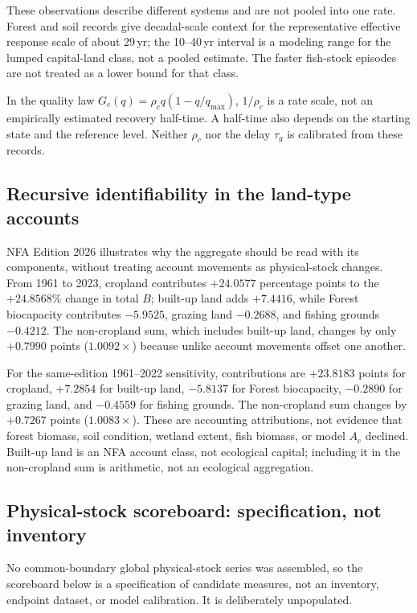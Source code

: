 \documentclass[11pt,a4paper]{article}
\begin{document}
These observations describe different systems and are not pooled into one rate. Forest and soil records give decadal-scale context for the representative effective response scale of about 29\,yr; the 10--40\,yr interval is a modeling range for the lumped capital-land class, not a pooled estimate. The faster fish-stock episodes are not treated as a lower bound for that class.

In the quality law $G_c(q)=\rho_c q(1-q/q_{\max})$, $1/\rho_c$ is a rate scale, not an empirically estimated recovery half-time. A half-time also depends on the starting state and the reference level. Neither $\rho_c$ nor the delay $\tau_g$ is calibrated from these records.

\subsection{Recursive identifiability in the land-type accounts}\label{si:recursive}

NFA Edition 2026 illustrates why the aggregate should be read with its components, without treating account movements as physical-stock changes. From 1961 to 2023, cropland contributes $+24.0577$ percentage points to the $+24.8568\%$ change in total $B$; built-up land adds $+7.4416$, while Forest biocapacity contributes $-5.9525$, grazing land $-0.2688$, and fishing grounds $-0.4212$. The non-cropland sum, which includes built-up land, changes by only $+0.7990$ points ($1.0092\times$) because unlike account movements offset one another.

For the same-edition 1961--2022 sensitivity, contributions are $+23.8183$ points for cropland, $+7.2854$ for built-up land, $-5.8137$ for Forest biocapacity, $-0.2890$ for grazing land, and $-0.4559$ for fishing grounds. The non-cropland sum changes by $+0.7267$ points ($1.0083\times$). These are accounting attributions, not evidence that forest biomass, soil condition, wetland extent, fish biomass, or model $A_c$ declined. Built-up land is an NFA account class, not ecological capital; including it in the non-cropland sum is arithmetic, not an ecological aggregation.

\subsection{Physical-stock scoreboard: specification, not inventory}\label{si:stocks}

No common-boundary global physical-stock series was assembled, so the scoreboard below is a specification of candidate measures, not an inventory, endpoint dataset, or model calibration. It is deliberately unpopulated.
\end{document}
